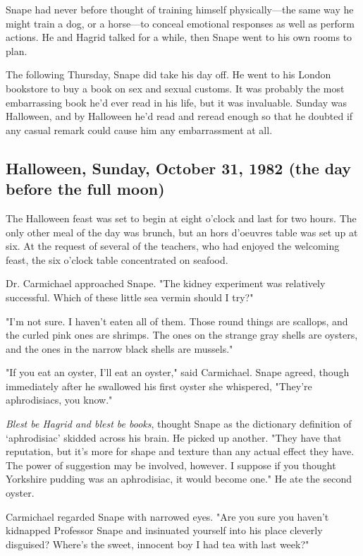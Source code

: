 Snape had never before thought of training himself physically—the same way he might train a dog, or a horse—to conceal emotional responses as well as perform actions. He and Hagrid talked for a while, then Snape went to his own rooms to plan.

The following Thursday, Snape did take his day off. He went to his London bookstore to buy a book on sex and sexual customs. It was probably the most embarrassing book he'd ever read in his life, but it was invaluable. Sunday was Halloween, and by Halloween he'd read and reread enough so that he doubted if any casual remark could cause him any embarrassment at all.

\subsection{Halloween, Sunday, October 31, 1982 (the day before the full moon)}

The Halloween feast was set to begin at eight o'clock and last for two hours. The only other meal of the day was brunch, but an hors d'oeuvres table was set up at six. At the request of several of the teachers, who had enjoyed the welcoming feast, the six o'clock table concentrated on seafood.

Dr. Carmichael approached Snape. "The kidney experiment was relatively successful. Which of these little sea vermin should I try?"

"I'm not sure. I haven't eaten all of them. Those round things are scallops, and the curled pink ones are shrimps. The ones on the strange gray shells are oysters, and the ones in the narrow black shells are mussels."

"If you eat an oyster, I'll eat an oyster," said Carmichael. Snape agreed, though immediately after he swallowed his first oyster she whispered, "They're aphrodisiacs, you know."

\emph{Blest be Hagrid and blest be books}, thought Snape as the dictionary definition of `aphrodisiac' skidded across his brain. He picked up another. "They have that reputation, but it's more for shape and texture than any actual effect they have. The power of suggestion may be involved, however. I suppose if you thought Yorkshire pudding was an aphrodisiac, it would become one." He ate the second oyster.

Carmichael regarded Snape with narrowed eyes. "Are you sure you haven't kidnapped Professor Snape and insinuated yourself into his place cleverly disguised? Where's the sweet, innocent boy I had tea with last week?"

